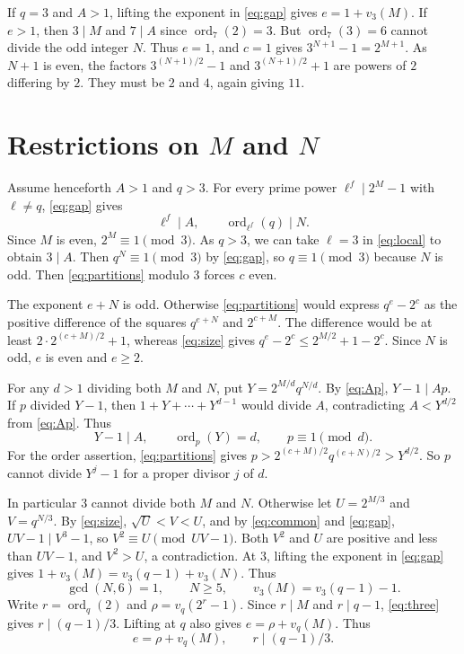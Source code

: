 \documentclass[11pt]{article}
\DeclareMathOperator{\ord}{ord}
\begin{document}
If $q=3$ and $A>1$, lifting the exponent in \eqref{eq:gap} gives
$e=1+v_3(M)$. If $e>1$, then $3\mid M$ and $7\mid A$ since
$\ord_7(2)=3$. But $\ord_7(3)=6$ cannot divide the odd integer $N$.
Thus $e=1$, and $c=1$ gives $3^{N+1}-1=2^{M+1}$. As $N+1$ is even,
the factors $3^{(N+1)/2}-1$ and $3^{(N+1)/2}+1$ are powers of $2$
differing by $2$. They must be $2$ and $4$, again giving $11$.

\section{Restrictions on \texorpdfstring{$M$ and $N$}{M and N}}
\label{sec:restrictions}

Assume henceforth $A>1$ and $q>3$. For every prime power
$\ell^f\mid 2^M-1$ with $\ell\ne q$, \eqref{eq:gap} gives
\begin{equation}\label{eq:local}
\ell^f\mid A,\qquad \ord_{\ell^f}(q)\mid N.
\end{equation}
Since $M$ is even, $2^M\equiv1\pmod3$. As $q>3$, we can take
$\ell=3$ in \eqref{eq:local} to obtain $3\mid A$. Then
$q^N\equiv1\pmod3$ by \eqref{eq:gap}, so $q\equiv1\pmod3$
because $N$ is odd.
Then \eqref{eq:partitions} modulo $3$ forces $c$ even.

The exponent $e+N$ is odd. Otherwise \eqref{eq:partitions} would
express $q^e-2^c$ as the positive difference of the squares
$q^{e+N}$ and $2^{c+M}$. The difference would be at least
$2\cdot2^{(c+M)/2}+1$, whereas \eqref{eq:size} gives
$q^e-2^c\le2^{M/2}+1-2^c$. Since $N$ is odd, $e$ is even and $e\ge2$.

For any $d>1$ dividing both $M$ and $N$, put $Y=2^{M/d}q^{N/d}$.
By \eqref{eq:Ap}, $Y-1\mid Ap$. If $p$ divided $Y-1$, then
$1+Y+\cdots+Y^{d-1}$ would divide $A$, contradicting
$A<Y^{d/2}$ from \eqref{eq:Ap}. Thus
\begin{equation}\label{eq:common}
Y-1\mid A,\qquad \ord_p(Y)=d,\qquad p\equiv1\pmod d.
\end{equation}
For the order assertion, \eqref{eq:partitions} gives
$p>2^{(c+M)/2}q^{(e+N)/2}>Y^{d/2}$. So $p$ cannot divide $Y^j-1$ for
a proper divisor $j$ of $d$.

In particular $3$ cannot divide both $M$ and $N$. Otherwise let
$U=2^{M/3}$ and $V=q^{N/3}$. By \eqref{eq:size},
$\sqrt U<V<U$, and by \eqref{eq:common} and \eqref{eq:gap},
$UV-1\mid V^3-1$, so $V^2\equiv U\pmod{UV-1}$.
Both $V^2$ and $U$ are positive and less than $UV-1$, and
$V^2>U$, a contradiction.
At $3$, lifting the exponent in \eqref{eq:gap} gives
$1+v_3(M)=v_3(q-1)+v_3(N)$. Thus
\begin{equation}\label{eq:three}
\gcd(N,6)=1,\qquad N\ge5,\qquad v_3(M)=v_3(q-1)-1.
\end{equation}
Write $r=\ord_q(2)$ and $\rho=v_q(2^r-1)$. Since $r\mid M$ and
$r\mid q-1$, \eqref{eq:three} gives $r\mid(q-1)/3$. Lifting at $q$
also gives $e=\rho+v_q(M)$. Thus
\begin{equation}\label{eq:qval}
e=\rho+v_q(M),\qquad r\mid(q-1)/3.
\end{equation}
\end{document}
